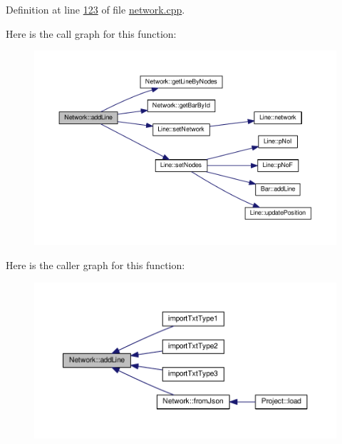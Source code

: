 Definition at line \hyperlink{network_8cpp_source_l00123}{123} of file \hyperlink{network_8cpp_source}{network.\+cpp}.



Here is the call graph for this function\+:
\nopagebreak
\begin{figure}[H]
\begin{center}
\leavevmode
\includegraphics[width=350pt]{group___models_gae02945131494987b3ff9b59b627719b4_cgraph}
\end{center}
\end{figure}




Here is the caller graph for this function\+:
\nopagebreak
\begin{figure}[H]
\begin{center}
\leavevmode
\includegraphics[width=350pt]{group___models_gae02945131494987b3ff9b59b627719b4_icgraph}
\end{center}
\end{figure}


\hypertarget{group___models_gabb1a3b7653d4e2327c4bf728210f197e}{}
